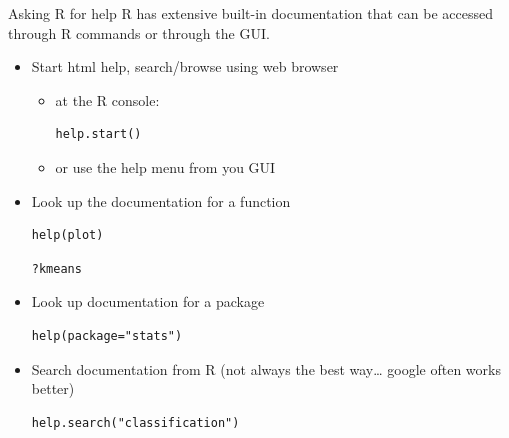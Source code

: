 \documentclass[table,smaller]{beamer}
\begin{document}
\begin{frame}[fragile,label=sec-4-1]{Asking R for help}
 R has extensive built-in documentation that can be accessed through R commands or through the GUI.
\begin{itemize}
\item Start html help, search/browse using web browser
\begin{itemize}
\item at the R console:
\begin{verbatim}
help.start()
\end{verbatim}

\item or use the help menu from you GUI
\end{itemize}

\item Look up the documentation for a function
\begin{verbatim}
help(plot)
\end{verbatim}

\begin{verbatim}
?kmeans
\end{verbatim}

\item Look up documentation for a package
\begin{verbatim}
help(package="stats")
\end{verbatim}

\item Search documentation from R (not always the best way\ldots{} google often works better)
\begin{verbatim}
help.search("classification")
\end{verbatim}
\end{itemize}
\end{frame}
\end{document}
